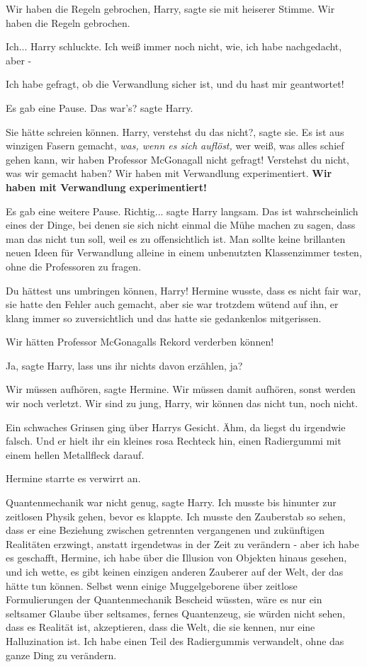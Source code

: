 \glqq{}Wir haben die Regeln gebrochen, Harry\grqq{}, sagte sie mit heiserer
Stimme. \glqq{}Wir haben die Regeln gebrochen.\grqq{}

\glqq{}Ich...\grqq{} Harry schluckte. \glqq{}Ich weiß immer noch nicht, wie, ich
habe nachgedacht, aber -\grqq{}

\glqq{}Ich habe gefragt, ob die Verwandlung sicher ist, und du hast mir
geantwortet!\grqq{}

Es gab eine Pause. \glqq{}Das war's?\grqq{} sagte Harry.

Sie hätte schreien können. \glqq{}Harry, verstehst du das nicht?\grqq{}, sagte
sie. \glqq{}Es ist aus winzigen Fasern gemacht,\emph{ was, wenn es sich auflöst,
}wer weiß, was alles schief gehen kann, wir haben Professor McGonagall nicht
gefragt! Verstehst du nicht, was wir gemacht haben? Wir haben mit Verwandlung
experimentiert. \textbf{Wir haben mit Verwandlung experimentiert!}\grqq{}

Es gab eine weitere Pause. \glqq{}Richtig...\grqq{} sagte Harry langsam. \glqq{}
Das ist wahrscheinlich eines der Dinge, bei denen sie sich nicht einmal die Mühe
machen zu sagen, dass man das nicht tun soll, weil es zu offensichtlich ist. Man
sollte keine brillanten neuen Ideen für Verwandlung alleine in einem unbenutzten
Klassenzimmer testen, ohne die Professoren zu fragen.\grqq{}

\glqq{}Du hättest uns umbringen können, Harry!\grqq{} Hermine wusste, dass es
nicht fair war, sie hatte den Fehler auch gemacht, aber sie war trotzdem wütend
auf ihn, er klang immer so zuversichtlich und das hatte sie gedankenlos
mitgerissen.

\glqq{}Wir hätten Professor McGonagalls Rekord verderben können!\grqq{}

\glqq{}Ja\grqq{}, sagte Harry, \glqq{}lass uns ihr nichts davon erzählen,
ja?\grqq{}

\glqq{}Wir müssen aufhören\grqq{}, sagte Hermine. \glqq{}Wir müssen damit
aufhören, sonst werden wir noch verletzt. Wir sind zu jung, Harry, wir können
das nicht tun, noch nicht.\grqq{}

Ein schwaches Grinsen ging über Harrys Gesicht. \glqq{}Ähm, da liegst du
irgendwie falsch.\grqq{} Und er hielt ihr ein kleines rosa Rechteck hin, einen
Radiergummi mit einem hellen Metallfleck darauf.

Hermine starrte es verwirrt an.

\glqq{}Quantenmechanik war nicht genug\grqq{}, sagte Harry. \glqq{}Ich musste bis
hinunter zur zeitlosen Physik gehen, bevor es klappte. Ich musste den Zauberstab
so sehen, dass er eine Beziehung zwischen getrennten vergangenen und zukünftigen
Realitäten erzwingt, anstatt irgendetwas in der Zeit zu verändern - aber ich
habe es geschafft, Hermine, ich habe über die Illusion von Objekten hinaus
gesehen, und ich wette, es gibt keinen einzigen anderen Zauberer auf der Welt,
der das hätte tun können. Selbst wenn einige Muggelgeborene über zeitlose
Formulierungen der Quantenmechanik Bescheid wüssten, wäre es nur ein seltsamer
Glaube über seltsames, fernes Quantenzeug, sie würden nicht sehen, dass es
Realität ist, akzeptieren, dass die Welt, die sie kennen, nur eine Halluzination
ist. Ich habe einen Teil des Radiergummis verwandelt, ohne das ganze Ding zu
verändern.\grqq{}

